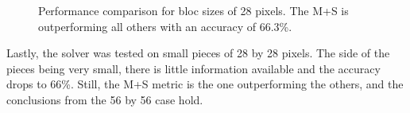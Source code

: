 \begin{figure}[H]
    \centering
    
    \caption{Performance comparison for bloc sizes of 28 pixels. The M+S is outperforming all others with an accuracy of 66.3\%.}
    \label{fig:perf28}
\end{figure}

Lastly, the solver was tested on small pieces of 28 by 28 pixels. The side of the pieces being very small, there is little information available and the accuracy drops to 66\%. Still, the M+S metric is the one outperforming the others, and the conclusions from the 56 by 56 case hold.